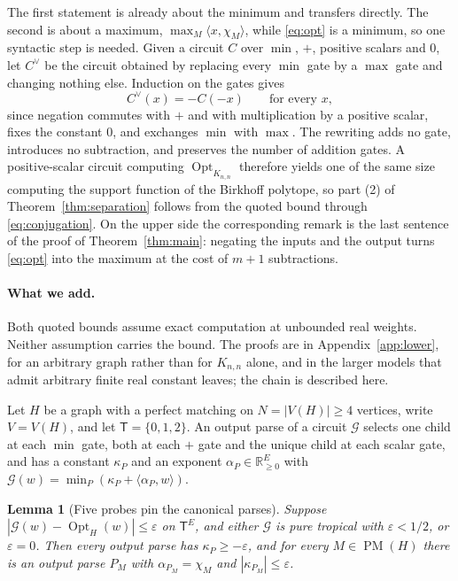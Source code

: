 \documentclass[11pt]{article}
\newtheorem{lemma}[theorem]{Lemma}
\newcommand{\Opt}{\operatorname{Opt}}
\newcommand{\PM}{\operatorname{PM}}
\begin{document}
The first statement is already about the minimum and transfers directly.  The
second is about a maximum, $\max_M\langle x,\chi_M\rangle$, while \eqref{eq:opt}
is a minimum, so one syntactic step is needed.  Given a circuit
$C$ over $\min$, $+$, positive scalars and $0$, let $C^{\vee}$ be the circuit
obtained by replacing every $\min$ gate by a $\max$ gate and changing nothing
else.  Induction on the gates gives
\begin{equation}
  C^{\vee}(x)=-C(-x)
  \qquad\text{for every } x,
  \label{eq:conjugation}
\end{equation}
since negation commutes with $+$ and with multiplication by a positive scalar,
fixes the constant $0$, and exchanges $\min$ with $\max$.  The rewriting adds no
gate, introduces no subtraction, and preserves the number of addition gates.  A
positive-scalar circuit computing $\Opt_{K_{n,n}}$ therefore yields one of the
same size computing the support function of the Birkhoff polytope, so part (2)
of Theorem~\ref{thm:separation} follows from the quoted bound through
\eqref{eq:conjugation}.  On the upper side the corresponding remark is the last
sentence of the proof of Theorem~\ref{thm:main}: negating the inputs and the
output turns \eqref{eq:opt} into the maximum at the cost of $m+1$ subtractions.

\paragraph{What we add.}
Both quoted bounds assume exact computation at unbounded real weights.  Neither
assumption carries the bound.  The proofs are in Appendix~\ref{app:lower}, for an
arbitrary graph rather than for $K_{n,n}$ alone, and in the larger models that
admit arbitrary finite real constant leaves; the chain is described here.

Let $H$ be a graph with a perfect matching on $N=|V(H)|\ge4$ vertices, write
$V=V(H)$, and let $\mathsf T=\{0,1,2\}$.  An output parse of a circuit
$\mathcal G$ selects one
child at each $\min$ gate, both at each $+$ gate and the unique child at each
scalar gate, and has a constant $\kappa_P$ and an exponent
$\alpha_P\in\mathbb R^{E}_{\ge0}$ with
$\mathcal G(w)=\min_P(\kappa_P+\langle\alpha_P,w\rangle)$.

\begin{lemma}[Five probes pin the canonical parses]
\label{lem:pin}
Suppose $|\mathcal G(w)-\Opt_H(w)|\le\varepsilon$ on $\mathsf T^{E}$, and either
$\mathcal G$ is pure tropical with $\varepsilon<1/2$, or $\varepsilon=0$.  Then
every output parse has $\kappa_P\ge-\varepsilon$, and for every $M\in\PM(H)$
there is an output parse $P_M$ with $\alpha_{P_M}=\chi_M$ and
$|\kappa_{P_M}|\le\varepsilon$.
\end{lemma}
\end{document}
